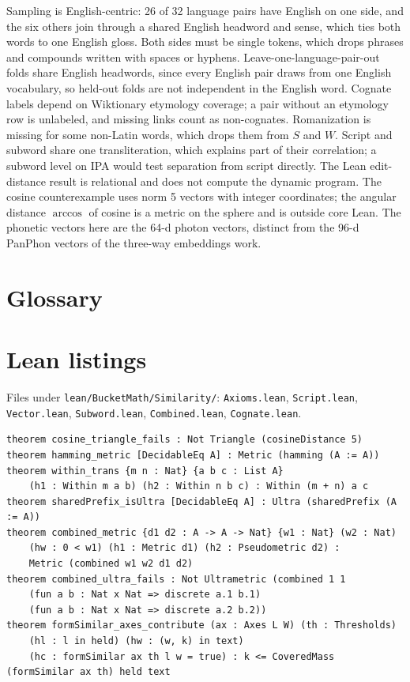 \documentclass[11pt]{article}
\begin{document}
Sampling is English-centric: 26 of 32 language pairs have English on one side, and the six others join through a shared English headword and sense, which ties both words to one English gloss. Both sides must be single tokens, which drops phrases and compounds written with spaces or hyphens. Leave-one-language-pair-out folds share English headwords, since every English pair draws from one English vocabulary, so held-out folds are not independent in the English word. Cognate labels depend on Wiktionary etymology coverage; a pair without an etymology row is unlabeled, and missing links count as non-cognates. Romanization is missing for some non-Latin words, which drops them from $S$ and $W$. Script and subword share one transliteration, which explains part of their correlation; a subword level on IPA would test separation from script directly. The Lean edit-distance result is relational and does not compute the dynamic program. The cosine counterexample uses norm 5 vectors with integer coordinates; the angular distance $\arccos$ of cosine is a metric on the sphere and is outside core Lean. The phonetic vectors here are the 64-d photon vectors, distinct from the 96-d PanPhon vectors of the three-way embeddings work.

\printbibliography

\appendix

\section{Glossary}
\label{app:glossary}


\section{Lean listings}
\label{app:lean}

Files under \texttt{lean/BucketMath/Similarity/}: \texttt{Axioms.lean}, \texttt{Script.lean}, \texttt{Vector.lean}, \texttt{Subword.lean}, \texttt{Combined.lean}, \texttt{Cognate.lean}.

\begin{lstlisting}[style=bucketlean]
theorem cosine_triangle_fails : Not Triangle (cosineDistance 5)
theorem hamming_metric [DecidableEq A] : Metric (hamming (A := A))
theorem within_trans {m n : Nat} {a b c : List A}
    (h1 : Within m a b) (h2 : Within n b c) : Within (m + n) a c
theorem sharedPrefix_isUltra [DecidableEq A] : Ultra (sharedPrefix (A := A))
theorem combined_metric {d1 d2 : A -> A -> Nat} {w1 : Nat} (w2 : Nat)
    (hw : 0 < w1) (h1 : Metric d1) (h2 : Pseudometric d2) :
    Metric (combined w1 w2 d1 d2)
theorem combined_ultra_fails : Not Ultrametric (combined 1 1
    (fun a b : Nat x Nat => discrete a.1 b.1)
    (fun a b : Nat x Nat => discrete a.2 b.2))
theorem formSimilar_axes_contribute (ax : Axes L W) (th : Thresholds)
    (hl : l in held) (hw : (w, k) in text)
    (hc : formSimilar ax th l w = true) : k <= CoveredMass (formSimilar ax th) held text
\end{lstlisting}
\end{document}
